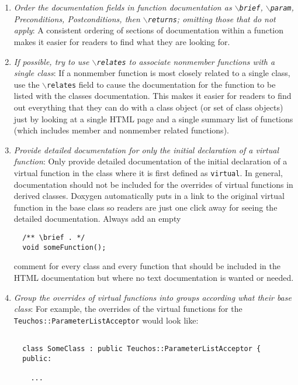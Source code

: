 \begin{enumerate}
{}\item\textit{Order the documentation fields in function documentation as
{}\texttt{$\backslash$brief}, {}\texttt{$\backslash$param}, Preconditions,
Postconditions, then {}\texttt{$\backslash$returns}; omitting those that do
not apply}: A consistent ordering of sections of documentation within a
function makes it easier for readers to find what they are looking for.

{}\item\textit{If possible, try to use {}\texttt{$\backslash$relates} to
associate nonmember functions with a single class}: If a nonmember function
is most closely related to a single class, use the
{}\texttt{$\backslash$relates} field to cause the documentation for the
function to be listed with the classes documentation.  This makes it easier
for readers to find out everything that they can do with a class object (or
set of class objects) just by looking at a single HTML page and a single
summary list of functions (which includes member and nonmember related
functions).

{}\item\textit{Provide detailed documentation for only the initial declaration
of a virtual function}: Only provide detailed documentation of the initial
declaration of a virtual function in the class where it is first defined as
{}\texttt{virtual}.  In general, documentation should not be included for the
overrides of virtual functions in derived classes.  Doxygen automatically puts
in a link to the original virtual function in the base class so readers are
just one click away for seeing the detailed documentation.  Always add an
empty
%
{\small\begin{verbatim}
  /** \brief . */
  void someFunction();
\end{verbatim}}
%
comment for every class and every function that should be included in the HTML
documentation but where no text documentation is wanted or needed.

{}\item\textit{Group the overrides of virtual functions into groups according
what their base class}: For example, the overrides of the virtual functions
for the {}\texttt{Teuchos\-::Parameter\-List\-Acceptor} would look like:

{\small\begin{verbatim}

  class SomeClass : public Teuchos::ParameterListAcceptor {
  public:

    ...


\end{verbatim}}
\end{enumerate}
